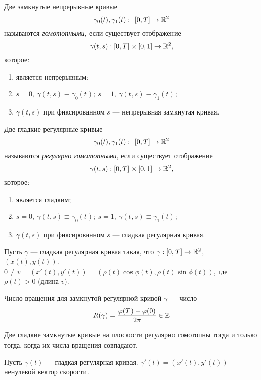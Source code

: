 \begin{definition}
    Две замкнутые непрерывные кривые $$\gamma_0(t), \gamma_1(t): \ [0, T] \to \mathbb{R}^2$$ называются \textit{гомотопными}, если существует отображение $$\gamma(t,s): [0, T] \times [0,1] \to \mathbb{R}^2,$$ которое:
    \begin{enumerate}
        \item является непрерывным;
        \item $s = 0, \ \gamma(t,s) \equiv \gamma_0(t); \ s = 1,\ \gamma(t,s) \equiv \gamma_1(t)$;
        \item $\gamma(t,s)$ при фиксированном $s$ — непрерывная замкнутая кривая.
    \end{enumerate}
\end{definition} 

\begin{definition}
    Две гладкие регулярные кривые $$\gamma_0(t), \gamma_1(t): \ [0, T] \to \mathbb{R}^2$$ называются \textit{регулярно гомотопными}, если существует отображение $$\gamma(t,s): [0, T] \times [0,1] \to \mathbb{R}^2,$$ которое:
    \begin{enumerate}
        \item является гладким;
        \item $s = 0, \ \gamma(t,s) \equiv \gamma_0(t); \ s = 1,\ \gamma(t,s) \equiv \gamma_1(t)$;
        \item $\gamma(t,s)$ при фиксированном $s$ — гладкая регулярная кривая.
    \end{enumerate}
\end{definition} 


Пусть $\gamma$ — гладкая регулярная кривая такая, что $\gamma: [0, T] \to \mathbb{R}^2$, $(x(t), y(t))$. $\bar{0} \neq v = (x'(t), y'(t)) = (\rho(t) \cos{\phi(t)}, \rho(t) \sin{\phi(t)})$, где $\rho(t) > 0$ (длина $v$).

\begin{definition}
    Число вращения для замкнутой регулярной кривой $\gamma$ — число $$R(\gamma) = \frac{\varphi(T) - \varphi(0)}{2 \pi} \in \mathbb{Z}$$
\end{definition}

\begin{theorem}[Уитни]
    Две гладкие замкнутые кривые на плоскости регулярно гомотопны тогда и только тогда, когда их числа вращения совпадают.
\end{theorem}

Пусть $\gamma(t)$ — гладкая регулярная кривая. $\gamma'(t) = (x'(t), y'(t))$ — ненулевой вектор скорости.

